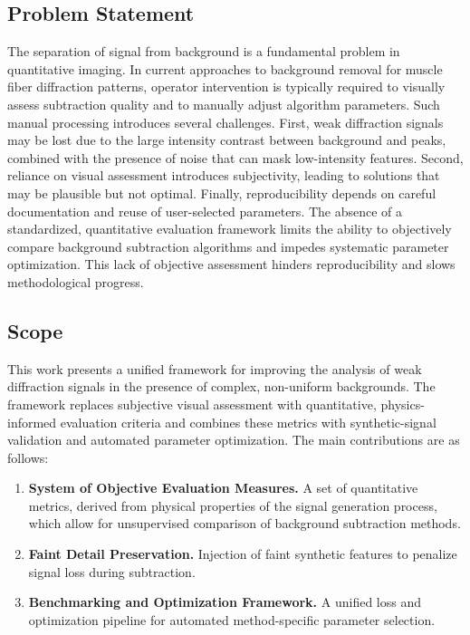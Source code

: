 \documentclass[11pt,onecolumn]{IEEEtran}
\begin{document}
\subsection{Problem Statement}

The separation of signal from background is a fundamental problem in quantitative imaging. In current approaches to background removal for muscle fiber diffraction patterns, operator intervention is typically required to visually assess subtraction quality and to manually adjust algorithm parameters. Such manual processing introduces several challenges. First, weak diffraction signals may be lost due to the large intensity contrast between background and peaks, combined with the presence of noise that can mask low-intensity features. Second, reliance on visual assessment introduces subjectivity, leading to solutions that may be plausible but not optimal. Finally, reproducibility depends on careful documentation and reuse of user-selected parameters. The absence of a standardized, quantitative evaluation framework limits the ability to objectively compare background subtraction algorithms and impedes systematic parameter optimization. This lack of objective assessment hinders reproducibility and slows methodological progress.


\subsection{Scope}

This work presents a unified framework for improving the analysis of weak diffraction signals in the presence of complex, non-uniform backgrounds. The framework replaces subjective visual assessment with quantitative, physics-informed evaluation criteria and combines these metrics with synthetic-signal validation and automated parameter optimization. The main contributions are as follows:


\begin{enumerate}
\item \textbf{System of Objective Evaluation Measures.} A set of quantitative metrics, derived from
physical properties of the signal generation process, which allow for unsupervised comparison of background subtraction methods.
\item \textbf{Faint Detail Preservation.} Injection of faint synthetic features to penalize signal loss during subtraction.
\item \textbf{Benchmarking and Optimization Framework.} A unified loss and optimization pipeline for automated method-specific parameter selection.
\end{enumerate}
\end{document}
